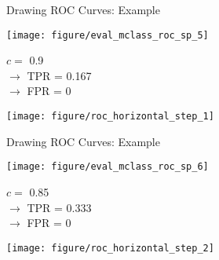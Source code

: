 \documentclass[11pt,compress,t,notes=noshow, xcolor=table]{beamer}
\begin{document}

\begin{vbframe}{Drawing ROC Curves: Example}
	
	
	\begin{knitrout}\scriptsize
		\color{fgcolor}
		
		{
			\texttt{[image: figure/eval\_mclass\_roc\_sp\_5]} 
		}
		
	\end{knitrout}
	
	\vfill
	
	\begin{minipage}[b]{0.3\textwidth}
		$c =$ 0.9\\ 
		$\rightarrow$ TPR = 0.167 \\
		$\rightarrow$ FPR = 0
	\end{minipage}%
	\begin{minipage}[b]{0.7\textwidth}
		\texttt{[image: figure/roc\_horizontal\_step\_1]} 
	\end{minipage}
	
\end{vbframe}


\begin{vbframe}{Drawing ROC Curves: Example}
	
	\begin{knitrout}\scriptsize
		\color{fgcolor}
		
		{
			\texttt{[image: figure/eval\_mclass\_roc\_sp\_6]}
		}
		
	\end{knitrout}
	
	\vfill
	
	\begin{minipage}[b]{0.3\textwidth}
		$c =$ 0.85\\ 
		$\rightarrow$ TPR = 0.333 \\
		$\rightarrow$ FPR = 0
	\end{minipage}%
	\begin{minipage}[b]{0.7\textwidth}
		\texttt{[image: figure/roc\_horizontal\_step\_2]} 
	\end{minipage}
	
\end{vbframe}
\end{document}
